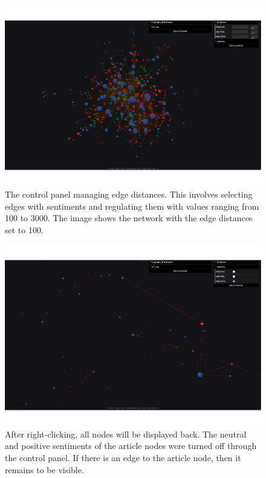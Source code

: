 \begin{figure}[htbp]
    \centering
    \includegraphics[width=\textwidth]{img/user/graphs-distances-a.pdf}
    \caption{The control panel managing edge distances. This involves selecting edges with sentiments and regulating them with values ranging from 100 to 3000. The image shows the network with the edge distances set to 100.}
    \label{fig:user-documentation-graphs-distances}
\end{figure}

\begin{figure}[htbp]
    \centering
    \includegraphics[width=\textwidth]{img/user/graphs-only-negative-a.pdf}
    \caption{After right-clicking, all nodes will be displayed back. The neutral and positive sentiments of the article nodes were turned off through the control panel. If there is an edge to the article node, then it remains to be visible.}
    \label{fig:user-documentation-graphs-only-negative}
\end{figure}

